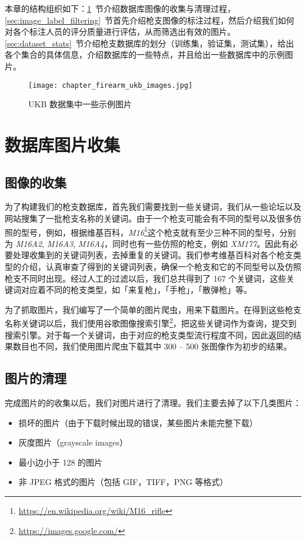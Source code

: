 本章的结构组织如下：\ref{sec:image_collect_clean}~节介绍数据库图像的收集与清理过程，\ref{sec:image_label_filtering}~节首先介绍枪支图像的标注过程，然后介绍我们如何对各个标注人员的评分质量进行评估，从而筛选出有效的图片。\ref{sec:dataset_stats}~节介绍枪支数据库的划分（训练集，验证集，测试集），给出各个集合的具体信息，介绍数据库的一些特点，并且给出一些数据库中的示例图片。

\begin{figure}[!t]
	\centering
	\texttt{[image: chapter\_firearm\_ukb\_images.jpg]}
	\caption{UKB 数据集中一些示例图片}
	\label{fig:ukb_images}
\end{figure}

\section{数据库图片收集}\label{sec:image_collect_clean}

\subsection{图像的收集}
为了构建我们的枪支数据库，首先我们需要找到一些关键词，我们从一些论坛以及网站搜集了一批枪支名称的关键词。由于一个枪支可能会有不同的型号以及很多仿照的型号，例如，根据维基百科，\emph{M16}\footnote{\url{https://en.wikipedia.org/wiki/M16_rifle}}这个枪支就有至少三种不同的型号，分别为 \emph{M16A2}, \emph{M16A3}, \emph{M16A4}，同时也有一些仿照的枪支，例如 \emph{XM177}。因此有必要处理收集到的关键词列表，去掉重复的关键词。我们参考维基百科对各个枪支类型的介绍，认真审查了得到的关键词列表，确保一个枪支和它的不同型号以及仿照枪支不同时出现。经过人工的过滤以后，我们总共得到了 167 个关键词，这些关键词对应着不同的枪支类型，如「来复枪」，「手枪」，「散弹枪」等。

为了抓取图片，我们编写了一个简单的图片爬虫，用来下载图片。在得到这些枪支名称关键词以后，我们使用谷歌图像搜索引擎\footnote{\url{https://images.google.com/}}，把这些关键词作为查询，提交到搜索引擎。对于每一个关键词，由于对应的枪支类型流行程度不同，因此返回的结果数目也不同，我们使用图片爬虫下载其中 300 -- 500 张图像作为初步的结果。

\subsection{图片的清理}
完成图片的的收集以后，我们对图片进行了清理。我们主要去掉了以下几类图片：
\begin{itemize}
\item 损坏的图片（由于下载时候出现的错误，某些图片未能完整下载）
\item 灰度图片（grayscale images）
\item 最小边小于 128 的图片
\item 非 JPEG 格式的图片（包括 GIF，TIFF，PNG 等格式）
\end{itemize}

